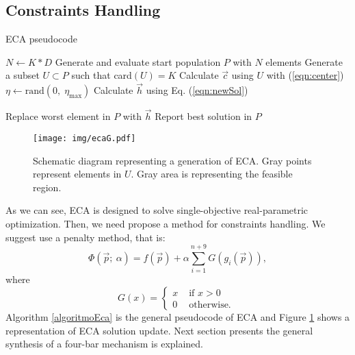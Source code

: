 \documentclass[12pt,letterpape]{article}
\begin{document}

\subsection{Constraints Handling} %
\label{sub:constraints_handling}

\begin{algorithm}[!ht]
	\caption{ECA pseudocode}
	\label{algoritmoEca}
	\begin{algorithmic}[1]
		\State $N \gets K * D$
		\State Generate and evaluate start population $P$ with $N$ elements
				\State Generate a subset $U \subset P$ such that  card$(U) = K$
				\State Calculate $\vec{c}$ using $U$ with (\ref{eqn:center})
				\State $\eta \gets \text{rand}(0,\; \eta_{\max}) $ 
				\State Calculate $\vec{h}$ using Eq. (\ref{eqn:newSol})
				
					\State Replace worst element in $P$ with $\vec{h}$
				\EndIf
			\EndFor
		\EndWhile
		\State Report best solution in $P$
		\EndProcedure
	\end{algorithmic}
\end{algorithm}


\begin{figure}[!ht]
	\centering
	\texttt{[image: img/ecaG.pdf]}
	\caption{Schematic diagram representing a generation of ECA. Gray points %
	represent elements in $U$. Gray area is representing the feasible region.}
	\label{fig:ecag}       %
\end{figure}

As we can see, ECA is designed to solve single-objective real-parametric optimization.
Then, we need propose a method for constraints handling. We suggest use a penalty
method, that is:
% 
\begin{equation}
	\Phi( \vec{p} ;\ \alpha ) = f( \vec{p} ) + \alpha \sum_{i=1}^{n+9} G(g_i( \vec{p} ) ),
% 
	\label{eqn:phiObj}
% 
\end{equation}
where 
$$
G(x) = 
\begin{cases}
	\displaystyle
	x & \text{ if } x > 0 \\
	0 & \text{ otherwise. }
\end{cases}
$$
% 
% 
% 
Algorithm \ref{algoritmoEca} is the general pseudocode of ECA and Figure \ref{fig:ecag} shows a representation of ECA solution update. Next section presents the general synthesis of a four-bar mechanism is explained.
% 
% 
\end{document}
